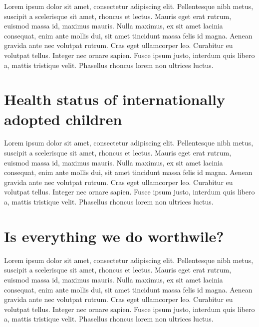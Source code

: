 

\label{chap:discussion}
Lorem ipsum dolor sit amet, consectetur adipiscing elit. Pellentesque nibh metus, suscipit a scelerisque sit amet, rhoncus et lectus. Mauris eget erat rutrum, euismod massa id, maximus mauris. Nulla maximus, ex sit amet lacinia consequat, enim ante mollis dui, sit amet tincidunt massa felis id magna. Aenean gravida ante nec volutpat rutrum. Cras eget ullamcorper leo. Curabitur eu volutpat tellus. Integer nec ornare sapien. Fusce ipsum justo, interdum quis libero a, mattis tristique velit. Phasellus rhoncus lorem non ultrices luctus.

\section{Health status of internationally adopted children}\label{sec:healthstatusofIAC}
Lorem ipsum dolor sit amet, consectetur adipiscing elit. Pellentesque nibh metus, suscipit a scelerisque sit amet, rhoncus et lectus. Mauris eget erat rutrum, euismod massa id, maximus mauris. Nulla maximus, ex sit amet lacinia consequat, enim ante mollis dui, sit amet tincidunt massa felis id magna. Aenean gravida ante nec volutpat rutrum. Cras eget ullamcorper leo. Curabitur eu volutpat tellus. Integer nec ornare sapien. Fusce ipsum justo, interdum quis libero a, mattis tristique velit. Phasellus rhoncus lorem non ultrices luctus.

\section{Is everything we do worthwile?}\label{sec:worthwile?}
Lorem ipsum dolor sit amet, consectetur adipiscing elit. Pellentesque nibh metus, suscipit a scelerisque sit amet, rhoncus et lectus. Mauris eget erat rutrum, euismod massa id, maximus mauris. Nulla maximus, ex sit amet lacinia consequat, enim ante mollis dui, sit amet tincidunt massa felis id magna. Aenean gravida ante nec volutpat rutrum. Cras eget ullamcorper leo. Curabitur eu volutpat tellus. Integer nec ornare sapien. Fusce ipsum justo, interdum quis libero a, mattis tristique velit. Phasellus rhoncus lorem non ultrices luctus.

